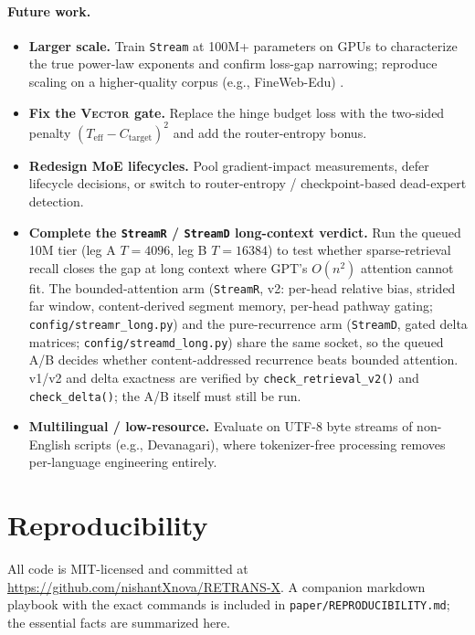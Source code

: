 \documentclass[11pt]{article}
\newcommand{\Stream}{\texttt{Stream}}
\newcommand{\StreamR}{\texttt{StreamR}}
\newcommand{\StreamD}{\texttt{StreamD}}
\newcommand{\Vector}{{\scshape Vector}}
\begin{document}
\paragraph{Future work.}
\begin{itemize}
  \item \textbf{Larger scale.} Train \Stream{} at 100M+ parameters on GPUs to
        characterize the true power-law exponents and confirm loss-gap
        narrowing; reproduce scaling on a higher-quality corpus (e.g.,
        FineWeb-Edu) \cite{Penedo2024FineWeb}.
  \item \textbf{Fix the \Vector{} gate.} Replace the hinge budget loss with the
        two-sided penalty $(T_{\text{eff}}-C_{\text{target}})^2$ and add the
        router-entropy bonus.
  \item \textbf{Redesign MoE lifecycles.} Pool gradient-impact measurements,
        defer lifecycle decisions, or switch to router-entropy / checkpoint-based
        dead-expert detection.
  \item \textbf{Complete the \StreamR{} / \StreamD{} long-context verdict.} Run
        the queued 10M tier (leg A $T{=}4096$, leg B $T{=}16384$) to test
        whether sparse-retrieval recall closes the gap at long context where
        GPT's $O(n^2)$ attention cannot fit. The bounded-attention arm (\StreamR{},
        v2: per-head relative bias, strided far window, content-derived segment
        memory, per-head pathway gating; \texttt{config/streamr\_long.py}) and the
        pure-recurrence arm (\StreamD{}, gated delta matrices;
        \texttt{config/streamd\_long.py}) share the same socket, so the queued
        A/B decides whether content-addressed recurrence beats bounded attention.
        v1/v2 and delta exactness are verified by \texttt{check\_retrieval\_v2()}
        and \texttt{check\_delta()}; the A/B itself must still be run.
  \item \textbf{Multilingual / low-resource.} Evaluate on UTF-8 byte streams of
        non-English scripts (e.g., Devanagari), where tokenizer-free processing
        removes per-language engineering entirely.
\end{itemize}

\section{Reproducibility}\label{sec:repro}

All code is MIT-licensed and committed at
\url{https://github.com/nishantXnova/RETRANS-X}. A companion markdown playbook
with the exact commands is included in \texttt{paper/REPRODUCIBILITY.md}; the
essential facts are summarized here.
\end{document}
